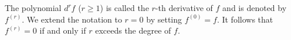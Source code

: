 The polynomial $d^r f$ ($r \geq 1$) is called the $r$-th derivative of $f$ and is denoted by $f^{(r)}$. We extend the notation to $r=0$ by setting $f^{(0)} = f$. It follows that $f^{(r)} = 0$ if and only if $r$ exceeds the degree of $f$.
